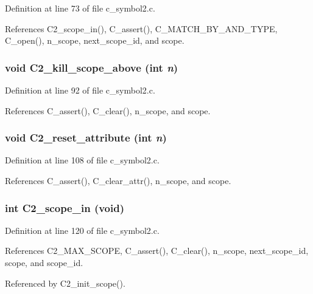 Definition at line 73 of file c\_\-symbol2.c.

References C2\_\-scope\_\-in(), C\_\-assert(), C\_\-MATCH\_\-BY\_\-AND\_\-TYPE, C\_\-open(), n\_\-scope, next\_\-scope\_\-id, and scope.
\subsubsection{\setlength{\rightskip}{0pt plus 5cm}void C2\_\-kill\_\-scope\_\-above (int {\em n})}\label{c__symbol2_8h_371a41afbac17260e344b11ea920a83b}




Definition at line 92 of file c\_\-symbol2.c.

References C\_\-assert(), C\_\-clear(), n\_\-scope, and scope.
\subsubsection{\setlength{\rightskip}{0pt plus 5cm}void C2\_\-reset\_\-attribute (int {\em n})}\label{c__symbol2_8h_8c94fb1ba2c62810210aeef02ef1f592}




Definition at line 108 of file c\_\-symbol2.c.

References C\_\-assert(), C\_\-clear\_\-attr(), n\_\-scope, and scope.
\subsubsection{\setlength{\rightskip}{0pt plus 5cm}int C2\_\-scope\_\-in (void)}\label{c__symbol2_8h_20ad889671b058864ad8e956c0fc3756}




Definition at line 120 of file c\_\-symbol2.c.

References C2\_\-MAX\_\-SCOPE, C\_\-assert(), C\_\-clear(), n\_\-scope, next\_\-scope\_\-id, scope, and scope\_\-id.

Referenced by C2\_\-init\_\-scope().

